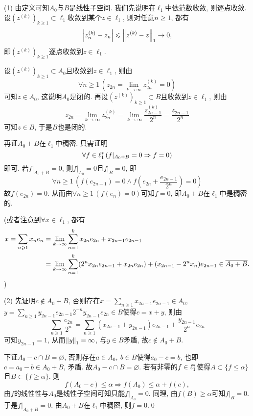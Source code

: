	\begin{Proof}
	(1) 由定义可知$ A_0 $与$ B $是线性子空间. 我们先说明在$ \ell_1 $中依范数收敛, 则逐点收敛. 设$ (z^{(k)})_{k\geqslant 1}\subset\ell_1 $收敛到某个$ z\in\ell_1 $, 则对任意$ n\geqslant 1 $, 都有
	\[
	\abs{z_n^{(k)}-z_n}\leqslant\norm{z^{(k)}-z}_1\to 0,
	\]
	即$ (z^{(k)})_{k\geqslant 1} $逐点收敛到$ z\in\ell_1 $.
	
	设$ (z^{(k)})_{k\geqslant 1}\subset A_0 $且收敛到$ z\in\ell_1 $, 则由
	\[
	\forall n\geqslant 1\,(z_{2n}=\lim_{k\to\infty}z_{2n}^{(k)}=0)
	\]
	可知$ z\in A_0 $, 这说明$ A_0 $是闭的. 再设$ (z^{(k)})_{k\geqslant 1}\subset B $且收敛到$ z\in\ell_1 $, 则由
	\[
	z_{2n}=\lim_{k\to\infty}z_{2n}^{(k)}=\lim_{k\to\infty}\frac{z_{2n-1}^{(k)}}{2^n}=\frac{z_{2n-1}}{2^n}
	\]
	可知$ z\in B $, 于是$ B $也是闭的.
	
	再证$ A_0+B $在$ \ell_1 $中稠密. 只需证明
	\[
	\forall f\in\Star{\ell_1}\,(f|_{A_0+B}=0\Rightarrow f=0)
	\]
	即可. 若$ f|_{A_0+B}=0 $, 则$ f|_{A_0}=0 $且$ f|_B=0 $, 即
	\[
	\forall n\geqslant 1\,\left(f(e_{2n-1})=0\land f\left(e_{2n}+\frac{e_{2n-1}}{2^n}\right)=0\right)
	\]
	故$ f(e_{2n})=0 $. 从而由$ \forall n\geqslant 1\,(f(e_n)=0) $可知$ f=0 $, 即$ A_0+B $在$ \ell_1 $中是稠密的.
	
	(或者注意到$ \forall x\in\ell_1 $, 都有
	\[
	\begin{aligned}
	x=\sum_{n\geqslant 1}x_ne_n&=\lim_{k\to\infty}\sum_{n=1}^kx_{2n}e_{2n}+x_{2n-1}e_{2n-1}\\
	&=\lim_{k\to\infty}\sum_{n=1}^k(2^nx_{2n}e_{2n-1}+x_{2n}e_{2n})+(x_{2n-1}-2^nx_n)e_{2n-1}\in\baro{A_0+B}.
	\end{aligned}
	\]
	)
	
	(2) 先证明$ c\notin A_0+B $, 否则存在$ x=\sum\limits_{n\geqslant 1}x_{2n-1}e_{2n-1}\in A_0 $, $ y=\sum\limits_{n\geqslant 1}y_{2n-1}e_{2n-1}2^{-n}y_{2n-1}e_{2n}\in B $使得$ c=x+y $, 则由
	\[
	\sum_{n\geqslant 1}\frac{e_{2n}}{2^n}=\sum_{n\geqslant 1}(x_{2n-1}+y_{2n-1})e_{2n-1}+\frac{y_{2n-1}}{2^n}e_{2n}
	\]
	可知$ y_{2n-1}=1 $, 从而$ \norm{y}_1=\infty $, 与$ y\in B $矛盾, 故$ c\notin A_0+B $.
	
	下证$ A_0-c\cap B=\varnothing $, 否则存在$ a\in A_0,\ b\in B $使得$ a_0-c=b $, 也即$ c=a_0-b\in A_0+B $, 矛盾. 故$ A_0-c\cap B=\varnothing $. 若有非零的$ f\in\Star{\ell_1} $使得$ A\subset\{ f\leqslant\alpha \} $且$ B\subset\{ f\geqslant\alpha \} $. 则
	\[
	f(A_0-c)\leqslant\alpha\Longrightarrow f(A_0)\leqslant\alpha+f(c),
	\]
	由$ f $的线性性与$ A_0 $是线性子空间可知只能$ f|_{A_0}=0 $. 同理, 由$ f(B)\geqslant\alpha $可知$ f|_B=0 $. 于是$ f|_{A_0+B}=0 $. 由$ A_0+B $在$ \ell_1 $中稠密, 则$ f=0 $.\qed
	\end{Proof}
	
